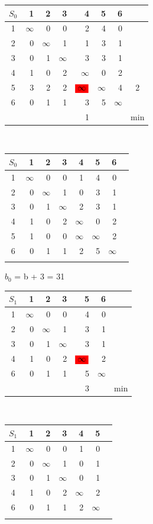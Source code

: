 \documentclass[12pt]{article}
\begin{document}
\begin{flushleft}
\begin{tabular}{c||rrrrrr||c}
$S_0$ & 1 & 2 & 3 & 4 & 5 & 6 & \\
\hline
\hline
1 & $\infty$ & 0 & 0 & 2 & 4 & 0 & \\
2 & 0 & $\infty$ & 1 & 1 & 3 & 1 & \\
3 & 0 & 1 & $\infty$ & 3 & 3 & 1 & \\
4 & 1 & 0 & 2 & $\infty$ & 0 & 2 & \\
5 & 3 & 2 & 2 & $\colorbox{red}{$\infty$}$ & $\infty$ & 4 & 2\\
6 & 0 & 1 & 1 & 3 & 5 & $\infty$ & \\
\hline
\hline
 &  &  &  & 1 & &  & min\\
\end{tabular}
$\qquad $  
\begin{tabular}{c||rrrrrr||c}
$S_0$ & 1 & 2 & 3 & 4 & 5 & 6 & \\
\hline
\hline
1 & $\infty$ & 0 & 0 & 1 & 4 & 0 & \\
2 & 0 & $\infty$ & 1 & 0 & 3 & 1 & \\
3 & 0 & 1 & $\infty$ & 2 & 3 & 1 & \\
4 & 1 & 0 & 2 & $\infty$ & 0 & 2 & \\
5 & 1 & 0 & 0 & $\infty$ & $\infty$ & 2 \\
6 & 0 & 1 & 1 & 2 & 5 & $\infty$ & \\
\hline
\hline
 &  &  &  &  &  &  & \\
\end{tabular}
\end{flushleft}

$b_0$ = b + 3 = 31

\begin{flushleft}
\begin{tabular}{c||rrrrr||c}
$S_1$ & 1 & 2 & 3  & 5 & 6\\
\hline
\hline
1 & $\infty$ & 0 & 0  & 4 & 0 & \\
2 & 0 & $\infty$ & 1  & 3 & 1 & \\
3 & 0 & 1 & $\infty$  & 3 & 1 & \\
4 & 1 & 0 & 2  & $\colorbox{red}{$\infty$}$ & 2 & \\
6 & 0 & 1 & 1  & 5 & $\infty$ & \\
\hline
\hline
 &  &  &  & 3 & & min\\
\end{tabular}
$\qquad $  
\begin{tabular}{c||rrrrr||c}
$S_1$ & 1 & 2 & 3 & 4 & 5 & \\
\hline
\hline
1 & $\infty$ & 0 & 0  & 1 & 0 & \\
2 & 0 & $\infty$ & 1  & 0 & 1 & \\
3 & 0 & 1 & $\infty$  & 0 & 1 & \\
4 & 1 & 0 & 2  & $\infty$ & 2 & \\
6 & 0 & 1 & 1  & 2 & $\infty$ & \\
\hline
\hline
 & &  &  &  & & \\
\end{tabular}
\end{flushleft}
\end{document}

